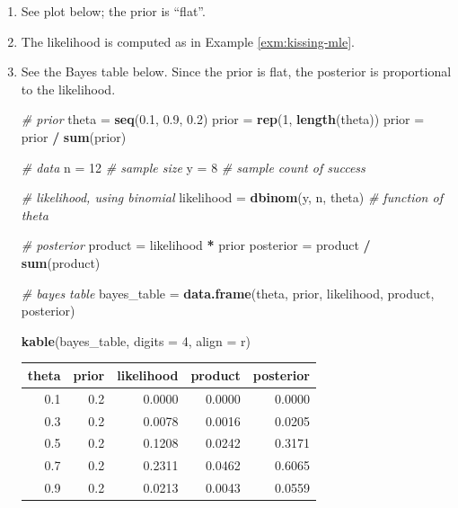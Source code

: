 \documentclass[
]{book}
\newenvironment{Shaded}{\begin{snugshade}}{\end{snugshade}}
\newcommand{\CommentTok}[1]{\textcolor[rgb]{0.56,0.35,0.01}{\textit{#1}}}
\newcommand{\DataTypeTok}[1]{\textcolor[rgb]{0.13,0.29,0.53}{#1}}
\newcommand{\DecValTok}[1]{\textcolor[rgb]{0.00,0.00,0.81}{#1}}
\newcommand{\FloatTok}[1]{\textcolor[rgb]{0.00,0.00,0.81}{#1}}
\newcommand{\KeywordTok}[1]{\textcolor[rgb]{0.13,0.29,0.53}{\textbf{#1}}}
\newcommand{\NormalTok}[1]{#1}
\newcommand{\OperatorTok}[1]{\textcolor[rgb]{0.81,0.36,0.00}{\textbf{#1}}}
\newcommand{\StringTok}[1]{\textcolor[rgb]{0.31,0.60,0.02}{#1}}
\theoremstyle{definition}
\theoremstyle{definition}
\theoremstyle{definition}
\theoremstyle{remark}
\begin{document}
\begin{enumerate}
\def\labelenumi{\arabic{enumi}.}
\item
  See plot below; the prior is ``flat''.
\item
  The likelihood is computed as in Example \ref{exm:kissing-mle}.
\item
  See the Bayes table below. Since the prior is flat, the posterior is proportional to the likelihood.

\begin{Shaded}
\begin{Highlighting}[]
\CommentTok{\# prior}
\NormalTok{theta =}\StringTok{ }\KeywordTok{seq}\NormalTok{(}\FloatTok{0.1}\NormalTok{, }\FloatTok{0.9}\NormalTok{, }\FloatTok{0.2}\NormalTok{)}
\NormalTok{prior =}\StringTok{ }\KeywordTok{rep}\NormalTok{(}\DecValTok{1}\NormalTok{, }\KeywordTok{length}\NormalTok{(theta))}
\NormalTok{prior =}\StringTok{ }\NormalTok{prior }\OperatorTok{/}\StringTok{ }\KeywordTok{sum}\NormalTok{(prior)}

\CommentTok{\# data}
\NormalTok{n =}\StringTok{ }\DecValTok{12} \CommentTok{\# sample size}
\NormalTok{y =}\StringTok{ }\DecValTok{8} \CommentTok{\# sample count of success}

\CommentTok{\# likelihood, using binomial}
\NormalTok{likelihood =}\StringTok{ }\KeywordTok{dbinom}\NormalTok{(y, n, theta) }\CommentTok{\# function of theta}

\CommentTok{\# posterior}
\NormalTok{product =}\StringTok{ }\NormalTok{likelihood }\OperatorTok{*}\StringTok{ }\NormalTok{prior}
\NormalTok{posterior =}\StringTok{ }\NormalTok{product }\OperatorTok{/}\StringTok{ }\KeywordTok{sum}\NormalTok{(product)}

\CommentTok{\# bayes table}
\NormalTok{bayes\_table =}\StringTok{ }\KeywordTok{data.frame}\NormalTok{(theta,}
\NormalTok{                     prior,}
\NormalTok{                     likelihood,}
\NormalTok{                     product,}
\NormalTok{                     posterior)}

\KeywordTok{kable}\NormalTok{(bayes\_table, }\DataTypeTok{digits =} \DecValTok{4}\NormalTok{, }\DataTypeTok{align =} \StringTok{\textquotesingle{}r\textquotesingle{}}\NormalTok{)}
\end{Highlighting}
\end{Shaded}

  \begin{tabular}{r|r|r|r|r}
   \hline
   theta & prior & likelihood & product & posterior\\
   \hline
   0.1 & 0.2 & 0.0000 & 0.0000 & 0.0000\\
   \hline
   0.3 & 0.2 & 0.0078 & 0.0016 & 0.0205\\
   \hline
   0.5 & 0.2 & 0.1208 & 0.0242 & 0.3171\\
   \hline
   0.7 & 0.2 & 0.2311 & 0.0462 & 0.6065\\
   \hline
   0.9 & 0.2 & 0.0213 & 0.0043 & 0.0559\\
   \hline
   \end{tabular}


\end{enumerate}
\end{document}
